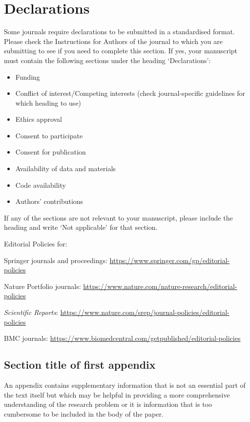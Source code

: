 \documentclass[iicol,sn-mathphys,Numbered]{sn-jnl}%
\theoremstyle{thmstyleone}%
\theoremstyle{thmstyletwo}%
\theoremstyle{thmstylethree}%
\begin{document}
\section*{Declarations}

Some journals require declarations to be submitted in a standardised format. Please check the Instructions for Authors of the journal to which you are submitting to see if you need to complete this section. If yes, your manuscript must contain the following sections under the heading `Declarations':

\begin{itemize}
\item Funding
\item Conflict of interest/Competing interests (check journal-specific guidelines for which heading to use)
\item Ethics approval 
\item Consent to participate
\item Consent for publication
\item Availability of data and materials
\item Code availability 
\item Authors' contributions
\end{itemize}

\noindent
If any of the sections are not relevant to your manuscript, please include the heading and write `Not applicable' for that section. 

\bigskip
\begin{flushleft}%
Editorial Policies for:

\bigskip\noindent
Springer journals and proceedings: \url{https://www.springer.com/gp/editorial-policies}

\bigskip\noindent
Nature Portfolio journals: \url{https://www.nature.com/nature-research/editorial-policies}

\bigskip\noindent
\textit{Scientific Reports}: \url{https://www.nature.com/srep/journal-policies/editorial-policies}

\bigskip\noindent
BMC journals: \url{https://www.biomedcentral.com/getpublished/editorial-policies}
\end{flushleft}

\begin{appendices}

\section{Section title of first appendix}\label{secA1}

An appendix contains supplementary information that is not an essential part of the text itself but 
which may be helpful in providing a more comprehensive understanding of the research problem or it is information that is too cumbersome to be included in the body of the paper.


\end{appendices}


\end{document}
